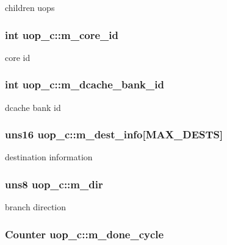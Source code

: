 \label{classuop__c_a2a5840c5dcfcb176ce0bd09c1e5c1e6b}
children uops \hypertarget{classuop__c_afb8bcaae7c15cde79f3d551e91c8c66b}{
\subsubsection[{m\_\-core\_\-id}]{\setlength{\rightskip}{0pt plus 5cm}int {\bf uop\_\-c::m\_\-core\_\-id}}}
\label{classuop__c_afb8bcaae7c15cde79f3d551e91c8c66b}
core id \hypertarget{classuop__c_a2f5f4bca667824fc726574f065524b1d}{
\subsubsection[{m\_\-dcache\_\-bank\_\-id}]{\setlength{\rightskip}{0pt plus 5cm}int {\bf uop\_\-c::m\_\-dcache\_\-bank\_\-id}}}
\label{classuop__c_a2f5f4bca667824fc726574f065524b1d}
dcache bank id \hypertarget{classuop__c_a875407660b76c8ded7c0df96b9a263b5}{
\subsubsection[{m\_\-dest\_\-info}]{\setlength{\rightskip}{0pt plus 5cm}uns16 {\bf uop\_\-c::m\_\-dest\_\-info}\mbox{[}MAX\_\-DESTS\mbox{]}}}
\label{classuop__c_a875407660b76c8ded7c0df96b9a263b5}
destination information \hypertarget{classuop__c_a7e8f609f4cfffed00ff9e4dc24cca06a}{
\subsubsection[{m\_\-dir}]{\setlength{\rightskip}{0pt plus 5cm}uns8 {\bf uop\_\-c::m\_\-dir}}}
\label{classuop__c_a7e8f609f4cfffed00ff9e4dc24cca06a}
branch direction \hypertarget{classuop__c_ae9691c0e5dbb1fbe05b57c25193ee0ce}{
\subsubsection[{m\_\-done\_\-cycle}]{\setlength{\rightskip}{0pt plus 5cm}Counter {\bf uop\_\-c::m\_\-done\_\-cycle}}}
